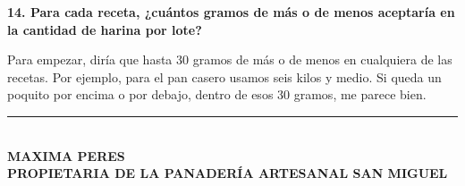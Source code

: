 \par\medskip

\noindent
\textbf{14. Para cada receta, ¿cuántos gramos de más o de menos aceptaría en la cantidad de harina por lote?}

Para empezar, diría que hasta 30 gramos de más o de menos en cualquiera de las recetas. Por ejemplo, para el pan casero usamos seis kilos y medio. Si queda un poquito por encima o por debajo, dentro de esos 30 gramos, me parece bien.

\begin{center}
    \vspace{1.5cm}
    \hspace*{0pt}
    \textcolor{gray}{\rule{180pt}{0.1pt}}
    \vspace{-0.2cm}\\
    \MakeUppercase{\bf{ Maxima Peres }}\\[-0.2cm]
    \MakeUppercase{\bf{ Propietaria de la panadería artesanal san miguel}}\\ 
\end{center}